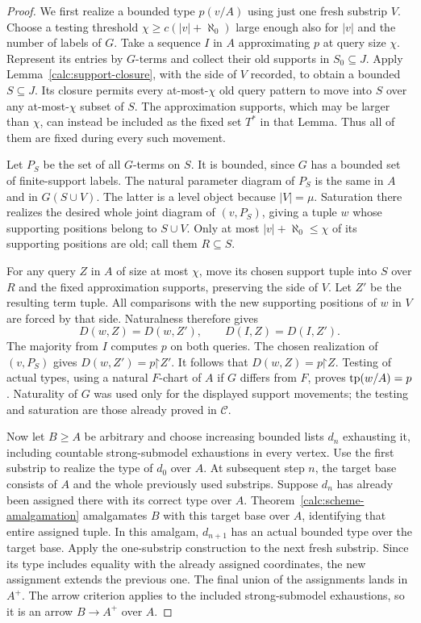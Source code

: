 \begin{proof}
We first realize a bounded type $p(v/A)$ using just one fresh
substrip $V$.  Choose a testing threshold $\chi\ge c(|v|+\aleph_0)$
large enough also for $|v|$ and the number of labels of $G$.
Take a sequence $I$ in $A$ approximating $p$ at query size $\chi$.
Represent its entries by $G$-terms and collect their old supports in
$S_0\subseteq J$.  Apply Lemma~\ref{calc:support-closure}, with
the side of $V$ recorded, to obtain a bounded $S\subseteq J$.
Its closure permits every at-most-$\chi$ old query pattern to move
into $S$ over any at-most-$\chi$ subset of $S$.  The approximation
supports, which may be larger than $\chi$, can instead be included
as the fixed set $T^*$ in that Lemma.  Thus all of them are fixed
during every such movement.

Let $P_S$ be the set of all $G$-terms on $S$.  It is bounded, since
$G$ has a bounded set of finite-support labels.  The natural
parameter diagram of $P_S$ is the same in $A$ and in $G(S\cup V)$.
The latter is a level object because $|V|=\mu$.  Saturation there
realizes the desired whole joint diagram of $(v,P_S)$, giving a
tuple $w$ whose supporting positions belong to $S\cup V$.
Only at most $|v|+\aleph_0\le\chi$ of its supporting positions
are old; call them $R\subseteq S$.

For any query $Z$ in $A$ of size at most $\chi$, move its chosen
support tuple into $S$ over $R$ and the fixed approximation
supports, preserving the side of $V$.  Let $Z'$ be the resulting
term tuple.  All comparisons with the new supporting positions
of $w$ in $V$ are forced by that side.  Naturalness therefore gives
\[
 D(w,Z)=D(w,Z'),\qquad D(I,Z)=D(I,Z').
\]
The majority from $I$ computes $p$ on both queries.  The chosen
realization of $(v,P_S)$ gives $D(w,Z')=p\mathord\upharpoonright Z'$.
It follows that $D(w,Z)=p\mathord\upharpoonright Z$.
Testing of actual types, using a natural $F$-chart of $A$ if $G$
differs from $F$, proves $\operatorname{tp}(w/A)=p$.  Naturality of $G$ was used
only for the displayed support movements; the testing and saturation
are those already proved in $\mathcal C$.

Now let $B\ge A$ be arbitrary and choose increasing bounded lists
$d_n$ exhausting it, including countable strong-submodel
exhaustions in every vertex.  Use the first substrip to realize the
type of $d_0$ over $A$.  At subsequent step $n$, the target base consists
of $A$ and the whole previously used substrips.  Suppose $d_n$ has
already been assigned there with its correct type over $A$.
Theorem~\ref{calc:scheme-amalgamation} amalgamates $B$ with this
target base over $A$, identifying that entire assigned tuple.
In this amalgam, $d_{n+1}$ has an actual bounded type over the
target base.  Apply the one-substrip construction to the next fresh
substrip.  Since its type includes equality with the already
assigned coordinates, the new assignment extends the previous one.
The final union of the assignments lands in $A^+$.  The arrow
criterion applies to the included strong-submodel exhaustions, so
it is an arrow $B\to A^+$ over $A$.
\end{proof}

